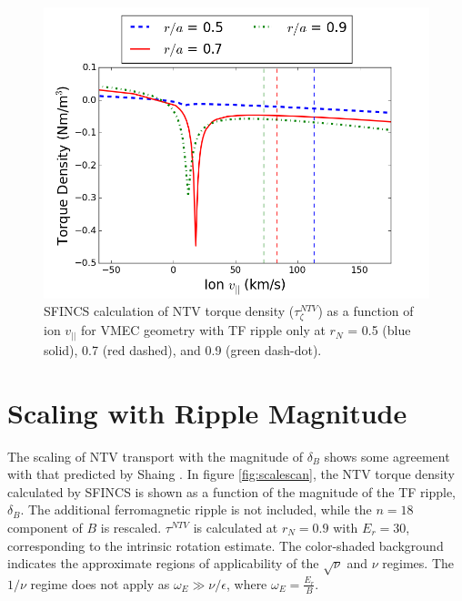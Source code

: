 \documentclass{article}
\begin{document}
\begin{figure}[h!]
\centering
\includegraphics[width=1\textwidth]
{Torque_radiusscaling.png}
\caption{\label{fig:Torque_radiusscaling} SFINCS calculation of NTV torque density ($\tau_{\zeta}^{NTV}$) as a function of ion $v_{||}$ for VMEC geometry with TF ripple only at $r_N$ = 0.5 (blue solid), 0.7 (red dashed), and 0.9 (green dash-dot).}
\end{figure}



\FloatBarrier

\section{Scaling with Ripple Magnitude}
The scaling of NTV transport with the magnitude of $\delta_B$ shows some agreement with that predicted by Shaing \cite{Shaing2008}. In figure \ref{fig:scalescan}, the NTV torque density calculated by SFINCS is shown as a function of the magnitude of the TF ripple, $\delta_B$. The additional ferromagnetic ripple is not included, while the $n=18$ component of $B$ is rescaled. $\tau^{NTV}$ is calculated at $r_N = 0.9$ with $E_r = 30$, corresponding to the intrinsic rotation estimate. The color-shaded background indicates the approximate regions of applicability of the $\sqrt{\nu}$ and $\nu$ regimes. The $1/\nu$ regime does not apply as $\omega_E \gg \nu/\epsilon$, where $\omega_E = \frac{E_r}{B}$. 
\end{document}
